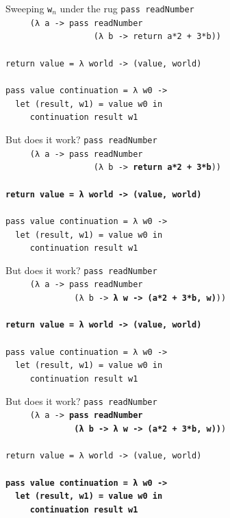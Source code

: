 \documentclass{beamer}
\begin{document}
\begin{frame}{Sweeping \texttt{w$_n$} under the rug}
  \texttt{pass readNumber \\
    \ \ \ \ \ (λ a \pause -> pass readNumber \\
    \ \ \ \ \ \ \ \ \ \ \ \ \ \ \ \ \ \ (λ b \pause -> return a*2 + 3*b)) \\
    \ \\ \pause
    return value = λ world -> (value, world) \\ \pause
    \ \\
    pass value continuation = λ w0 -> \\
    \ \ let (result, w1) = value w0 in \\
    \ \ \ \ \ continuation result w1
  }
\end{frame}


\begin{frame}{But does it work?}
  \texttt{pass readNumber\\
    \ \ \ \ \ (λ a -> pass readNumber\\
    \ \ \ \ \ \ \ \ \ \ \ \ \ \ \ \ \ \ (λ b -> \textbf{return a*2 + 3*b}))\\
    \ \\
    \textbf{return value = λ world -> (value, world)} \\
    \ \\
    pass value continuation = λ w0 -> \\
    \ \ let (result, w1) = value w0 in \\
    \ \ \ \ \ continuation result w1
  }
\end{frame}

\begin{frame}{But does it work?}
  \texttt{pass readNumber\\
    \ \ \ \ \ (λ a -> pass readNumber\\
    \ \ \ \ \ \ \ \ \ \ \ \ \ \ (λ b -> \textbf{λ w -> (a*2 + 3*b, w)}))\\
    \ \\
    \textbf{return value = λ world -> (value, world)} \\
    \ \\
    pass value continuation = λ w0 -> \\
    \ \ let (result, w1) = value w0 in \\
    \ \ \ \ \ continuation result w1
  }
\end{frame}

\begin{frame}{But does it work?}
  \texttt{pass readNumber\\
    \ \ \ \ \ (λ a -> \textbf{pass readNumber\\
      \ \ \ \ \ \ \ \ \ \ \ \ \ \ (λ b -> λ w -> (a*2 + 3*b, w))})\\
    \ \\
    return value = λ world -> (value, world) \\
    \ \\
    \textbf{pass value continuation = λ w0 -> \\
      \ \ let (result, w1) = value w0 in \\
      \ \ \ \ \ continuation result w1}
  }
\end{frame}
\end{document}
